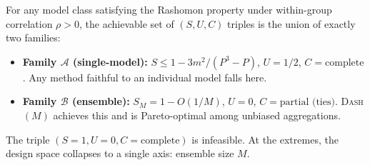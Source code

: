 \documentclass{jmlr}
\newcommand{\DASH}{\textsc{Dash}}
\begin{document}
\begin{theorem}
\label{thm:design-space-main}
For any model class satisfying the Rashomon property under within-group correlation $\rho > 0$, the achievable set of $(S, U, C)$ triples is the union of exactly two families:
\begin{itemize}
    \item \textbf{Family $\mathcal{A}$ (single-model):} $S \leq 1 - 3m^2/(P^3{-}P)$, $U = 1/2$, $C = \text{complete}$. Any method faithful to an individual model falls here.
    \item \textbf{Family $\mathcal{B}$ (ensemble):} $S_M = 1 - O(1/M)$, $U = 0$, $C = \text{partial (ties)}$. \DASH{}$(M)$ achieves this and is Pareto-optimal among unbiased aggregations.
\end{itemize}
The triple $(S{=}1, U{=}0, C{=}\text{complete})$ is infeasible. At the extremes, the design space collapses to a single axis: ensemble size $M$.
\end{theorem}
\end{document}
